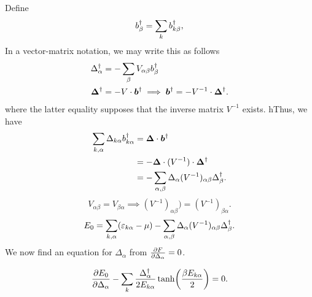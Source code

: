 Define 
\begin{equation}
	b_{\beta}^{\dagger} = \sum_{k}b_{k\beta}^{\dagger},
\end{equation}
In a vector-matrix notation, we may write this as follows
\begin{align}
	\Delta_{\alpha}^{\dagger} &= -\sum_{\beta}V_{\alpha\beta}b_{\beta}^{\dagger} \\
	\bm{\Delta}^{\dagger} &= -{V}\cdot \bm{b}^{\dagger} \implies \bm{b}^{\dagger} = -{V}^{-1}\cdot\bm{\Delta}^{\dagger}.
\end{align}
where the latter equality supposes that the inverse matrix $V^{-1}$ exists. h{Thus, we have}
\begin{align}
	\sum_{k,\alpha}\Delta_{k\alpha}b_{k\alpha}^{\dagger}&= \bm{\Delta}\cdot\bm{b}^{\dagger}\nonumber \\
	&= - \bm{\Delta}\cdot ({V}^{-1})\cdot \bm{\Delta}^{\dagger} \nonumber \\
	&= -\sum_{\alpha,\beta}\Delta_{\alpha}(V^{-1})_{\alpha\beta}\Delta_{\beta}^{\dagger}.
\end{align}
\begin{equation}
	V_{\alpha\beta} = V_{\beta\alpha} \implies (V^{-1})_{\alpha\beta})=(V^{-1})_{\beta\alpha}.
\end{equation}
\begin{equation}
	E_0 = \sum_{k,\alpha}(\varepsilon_{k\alpha}-\mu)- \sum_{\alpha, \beta}\Delta_{\alpha}(V^{-1})_{\alpha\beta}\Delta_{\beta}^{\dagger}.
\end{equation}
We now find an equation for $\Delta_\alpha$ from $\pdv{F}{\Delta_{\alpha}} = 0$.
\begin{tcolorbox}
	\begin{equation}
		\pdv{E_0}{\Delta_{\alpha}} - \sum_{k}\frac{\Delta_{\alpha}^{\dagger}}{2E_{k\alpha}}\tanh(\frac{\beta E_{k\alpha}}{2}) = 0.
	\end{equation}
\end{tcolorbox}

